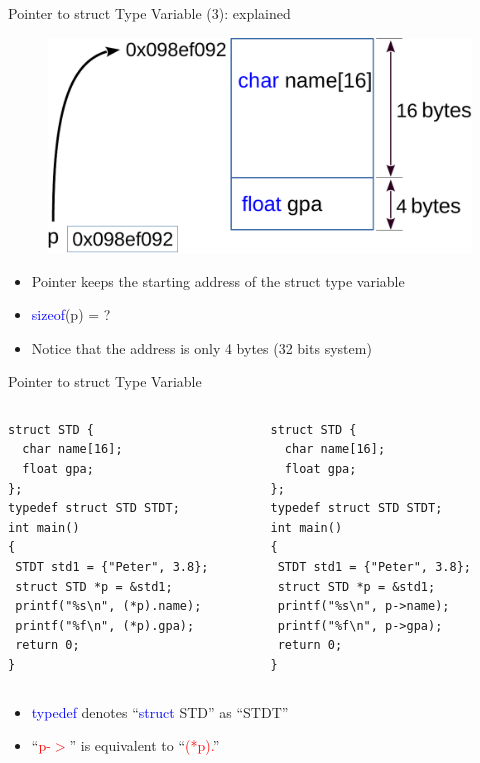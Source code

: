\begin{frame}[fragile]{Pointer to struct Type Variable (3): explained}
\vspace{0.15in}
\begin{figure}
	\includegraphics[width=0.55\linewidth]{figs/p2struct.pdf}
\end{figure}
\begin{itemize}
	\item {Pointer keeps the starting address of the struct type variable}
	\item {\textcolor{blue}{sizeof}(p) = ?}
	\item {Notice that the address is only 4 bytes (32 bits system)}
\end{itemize}
\end{frame}

\begin{frame}[fragile]{Pointer to struct Type Variable}
\vspace{-0.2in}
\begin{columns}
\begin{column}{0.46\linewidth}
\begin{lstlisting}
struct STD {
  char name[16];
  float gpa;
};
typedef struct STD STDT;
int main()
{
 STDT std1 = {"Peter", 3.8};
 struct STD *p = &std1;
 printf("%s\n", (*p).name);
 printf("%f\n", (*p).gpa);
 return 0;
}
\end{lstlisting}
\end{column}
\begin{column}{0.46\linewidth}
\begin{lstlisting}
struct STD {
  char name[16];
  float gpa;
};
typedef struct STD STDT;
int main()
{
 STDT std1 = {"Peter", 3.8};
 struct STD *p = &std1;
 printf("%s\n", p->name);
 printf("%f\n", p->gpa);
 return 0;
}
\end{lstlisting}
\end{column}
\end{columns}
\begin{itemize}
	\item {\textcolor{blue}{typedef} denotes ``\textcolor{blue}{struct} STD'' as ``STDT''}
	\item {``\textcolor{red}{p-$>$}'' is equivalent to ``\textcolor{red}{(*p).}''}
\end{itemize}
\end{frame}

